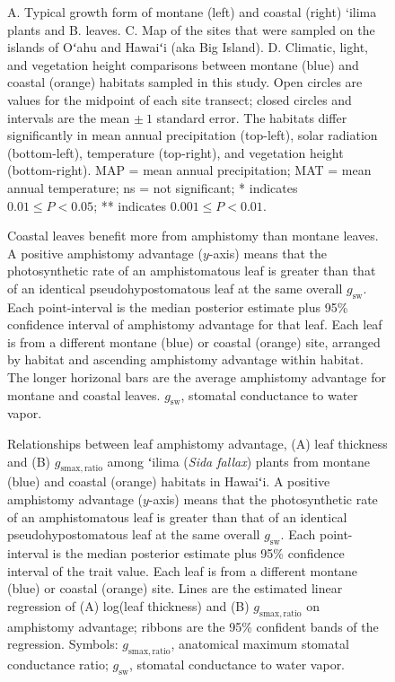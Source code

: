 \documentclass[
  letterpaper,
  DIV=11,
  numbers=noendperiod]{scrartcl}
\begin{document}
\begin{figure}[H]
  \caption{A. Typical growth form of montane (left) and coastal (right) ‘ilima plants and B. leaves. C. Map of the sites that were sampled on the islands of Oʻahu and Hawaiʻi (aka Big Island). D. Climatic, light, and vegetation height comparisons between montane (blue) and coastal (orange) habitats sampled in this study. Open circles are values for the midpoint of each site transect; closed circles and intervals are the mean $\pm~1$ standard error. The habitats differ significantly in mean annual precipitation (top-left), solar radiation (bottom-left), temperature (top-right), and vegetation height (bottom-right). MAP = mean annual precipitation; MAT = mean annual temperature; ns = not significant; * indicates $0.01 \le P < 0.05$; ** indicates $0.001 \le P < 0.01$.}
  \label{fig:study-system}
\end{figure}

\begin{figure}[H]
  \caption{Coastal leaves benefit more from amphistomy than montane leaves. A positive amphistomy advantage ($y$-axis) means that the photosynthetic rate of an amphistomatous leaf is greater than that of an identical pseudohypostomatous leaf at the same overall $g_\mathrm{sw}$. Each point-interval is the median posterior estimate plus 95\% confidence interval of amphistomy advantage for that leaf. Each leaf is from a different montane (blue) or coastal (orange) site, arranged by habitat and ascending amphistomy advantage within habitat. The longer horizonal bars are the average amphistomy advantage for montane and coastal leaves. $g_\mathrm{sw}$, stomatal conductance to water vapor.}
  \label{fig:habitat-aa}
\end{figure}

\begin{figure}[H]
  \caption{Relationships between leaf amphistomy advantage, (A) leaf thickness and (B) $g_\mathrm{smax,ratio}$ among ʻilima (\textit{Sida fallax}) plants from montane (blue) and coastal (orange) habitats in Hawaiʻi. A positive amphistomy advantage ($y$-axis) means that the photosynthetic rate of an amphistomatous leaf is greater than that of an identical pseudohypostomatous leaf at the same overall $g_\mathrm{sw}$. Each point-interval is the median posterior estimate plus 95\% confidence interval of the trait value. Each leaf is from a different montane (blue) or coastal (orange) site. Lines are the estimated linear regression of (A) log(leaf thickness) and (B) $g_\mathrm{smax,ratio}$ on amphistomy advantage; ribbons are the 95\% confident bands of the regression. Symbols: $g_\mathrm{smax,ratio}$, anatomical maximum stomatal conductance ratio; $g_\mathrm{sw}$, stomatal conductance to water vapor.}
  \label{fig:traits-aa}
\end{figure}
\end{document}
